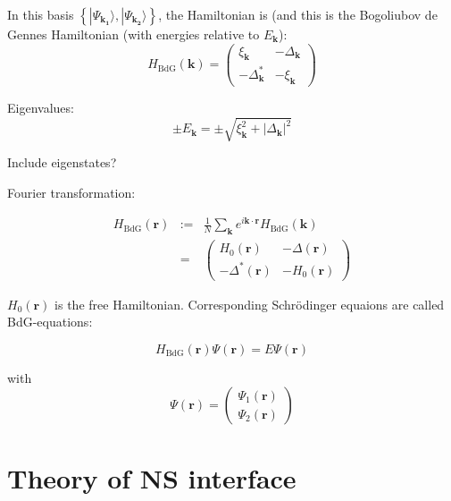 In this basis $\left\{| \Psi_\mathbf{k_1} \rangle, | \Psi_\mathbf{k_2} \rangle \right\}$, the Hamiltonian is (and this is the Bogoliubov de Gennes Hamiltonian (with energies relative to $E_\mathbf{k}$):
\begin{equation}
H_\text{BdG}\left(\mathbf{k} \right) = \begin{pmatrix}
\xi_\mathbf{k} &  - \Delta_\mathbf{k}\\
- \Delta^*_\mathbf{k} & - \xi_\mathbf{k}
\end{pmatrix}
\end{equation}

Eigenvalues: 
\begin{equation}
 \pm E_\mathbf{k} = \pm \sqrt{\xi_\mathbf{k}^2 + |\Delta_\mathbf{k}|^2  }
\end{equation}

Include eigenstates?

Fourier transformation:

\begin{eqnarray}
H_\text{BdG} \left( \mathbf{r} \right) &:=& \frac{1}{N} \sum_\mathbf{k} e^{i \mathbf{k \cdot r}} H_\text{BdG}\left( \mathbf{k} \right) \\
&=& \begin{pmatrix}
H_0\left( \mathbf{r} \right)  &  - \Delta \left( \mathbf{r} \right) \\
- \Delta^* \left( \mathbf{r} \right)  & - H_0 \left( \mathbf{r} \right) 
\end{pmatrix}
\end{eqnarray}

$H_0 \left( \mathbf{r} \right) $ is the free Hamiltonian. Corresponding Schr\"odinger equaions are called BdG-equations:

\begin{equation}
H_\text{BdG} \left( \mathbf{r} \right) \Psi\left( \mathbf{r} \right) = E \Psi\left( \mathbf{r} \right)
\end{equation}

with \begin{equation}
\Psi\left( \mathbf{r} \right)  = \begin{pmatrix}
\Psi_1\left( \mathbf{r} \right) \\ \Psi_2\left( \mathbf{r} \right) 
\end{pmatrix}
\end{equation}
\section{Theory of NS interface}

